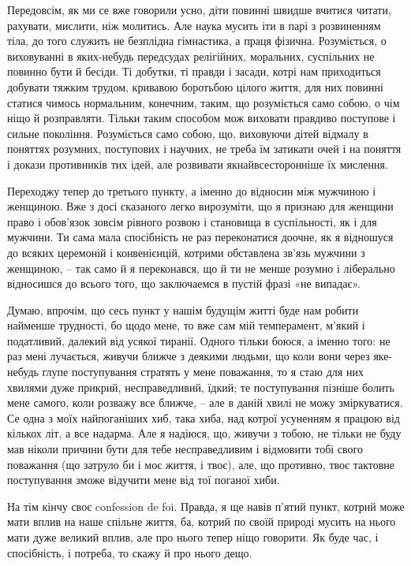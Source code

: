 Передовсім, як ми се вже говорили усно, діти повинні швидше вчитися читати,
рахувати, мислити, ніж молитись. Але наука мусить іти в парі з розвиненням
тіла, до того служить не безплідна гімнастика, а праця фізична. Розуміється, о
виховуванні в яких-небудь передсудах релігійних, моральних, суспільних не
повинно бути й бесіди. Ті добутки, ті правди і засади, котрі нам приходиться
добувати тяжким трудом, кривавою боротьбою цілого життя, для них повинні
статися чимось нормальним, конечним, таким, що розуміється само собою, о чім
ніщо й розправляти. Тільки таким способом мож виховати правдиво поступове і
сильне покоління. Розуміється само собою, що, виховуючи дітей відмалу в
поняттях розумних, поступових і научних, не треба їм затикати очей і на поняття
і докази противників тих ідей, але розвивати якнайвсесторонніше їх мислення.

Переходжу тепер до третього пункту, а іменно до відносин між мужчиною і
женщиною. Вже з досі сказаного легко вирозуміти, що я признаю для женщини право
і обов’язок зовсім рівного розвою і становища в суспільності, як і для мужчини.
Ти сама мала спосібність не раз переконатися доочне, як я відношуся до всяких
церемоній і конвенієнцій, котрими обставлена зв’язь мужчини з женщиною, – так
само й я переконався, що й ти не менше розумно і ліберально відносишся до
всього того, що заключаемся в пустій фразі «не випадає».

Думаю, впрочім, що сесь пункт у нашім будущім житті буде нам робити найменше
трудності, бо щодо мене, то вже сам мій темперамент, м’який і податливий,
далекий від усякої тиранії. Одного тільки боюся, а іменно того: не раз мені
лучається, живучи ближче з деякими людьми, що коли вони через яке-небудь глупе
поступування стратять у мене поважання, то я стаю для них хвилями дуже прикрий,
несправедливий, їдкий; те поступування пізніше болить мене самого, коли розважу
все ближче, – але в даній хвилі не можу зміркуватися. Се одна з моїх
найпоганіших хиб, така хиба, над котрої усуненням я працюю від кількох літ, а
все надарма. Але я надіюся, що, живучи з тобою, не тільки не буду мав ніколи
причини бути для тебе несправедливим і відмовити тобі свого поважання (що
затруло би і моє життя, і твоє), але, що противно, твоє тактовне поступування
зможе відучити мене від тої поганої хиби.

На тім кінчу своє confession de foi. Правда, я ще навів п’ятий пункт, котрий
може мати вплив на наше спільне життя, ба, котрий по своїй природі мусить на
нього мати дуже великий вплив, але про нього тепер ніщо говорити. Як буде час,
і спосібність, і потреба, то скажу й про нього дещо.

